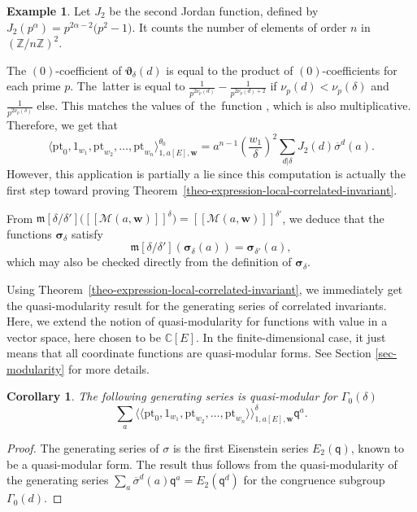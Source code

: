 \documentclass[11pt]{article}
\numberwithin{equation}{section}
\newcommand{\fvir}[2]{[\![ #1 ]\!]^{#2}}
\newcommand{\pt}{\mathrm{pt}}
\newcommand{\m}[1]{\mfk\left[ #1 \right]}
\newcommand{\ZZ}{\mathbb{Z}}
\newcommand{\CC}{\mathbb{C}}
\newcommand{\bfw}{ {\boldsymbol w} }
\newcommand{\mfk}{\mathfrak{m}}
\newcommand{\sfq}{\mathsf{q}}
\newcommand{\M}{\mathcal{M}}
\numberwithin{equation}{section}
\newtheorem{coro}[theo]{Corollary}
\theoremstyle{definition}
\newtheorem{expl}[theo]{Example}
\begin{document}
\begin{expl}
 Let $J_2$ be the second Jordan function, defined by $J_2(p^\alpha)=p^{2\alpha-2}\bigl(p^2-1\bigr)$. It counts the number of elements of order $n$ in $(\ZZ/n\ZZ)^2$.

 The $(0)$-coefficient of $\boldsymbol{\vartheta}_\delta(d)$ is equal to the product of $(0)$-coefficients for each prime $p$. The~latter is equal to $\frac{1}{p^{2\nu_p(d)}}\!-\!\frac{1}{p^{2\nu_p(d)+2}}$ if $\nu_p(d)\!<\!\nu_p(\delta)$ and $\frac{1}{p^{2\nu_p(\delta)}}$ else. This matches the values of~the~function , which is also multiplicative. Therefore,
 we get that
 \[ \langle \pt_0,1_{w_1},\pt_{w_2},\dots,\pt_{w_n}\rangle^{\theta_0}_{1,a[E],\bfw} =a^{n-1}\left(\frac{w_1}{\delta}\right)^2\sum_{d|\delta}J_2(d)\overline{\sigma}^d(a). \]
 However, this application is partially a lie since this computation is actually the first step toward proving Theorem~\ref{theo-expression-local-correlated-invariant}.
\end{expl}

From $\m{\delta/\delta'}\bigl(\fvir{\M(a,\bfw)}{\delta}\bigr) = \fvir{\M(a,\bfw)}{\delta'}$, we deduce that the functions $\boldsymbol{\sigma}_\delta$ satisfy
\[ \m{\delta/\delta'}(\boldsymbol{\sigma}_\delta(a)) = \boldsymbol{\sigma}_{\delta'}(a),\]
which may also be checked directly from the definition of $\boldsymbol{\sigma}_\delta$.

Using Theorem~\ref{theo-expression-local-correlated-invariant}, we immediately get the quasi-modularity result for the generating series of correlated invariants. Here, we extend the notion of quasi-modularity for functions with value in a vector space, here chosen to be $\CC[E]$. In the finite-dimensional case, it just means that all coordinate functions are quasi-modular forms. See Section \ref{sec-modularity} for more details.

\begin{coro}
The following generating series is quasi-modular for $\Gamma_0(\delta)$
\[ \sum_a \langle\langle \pt_0,1_{w_1},\pt_{w_2},\dots,\pt_{w_n} \rangle\rangle^\delta_{1,a[E],\bfw}\sfq^a.\]
\end{coro}

\begin{proof}
 The generating series of $\sigma$ is the first Eisenstein series $E_2(\sfq)$, known to be a quasi-modular form. The result thus follows from the quasi-modularity of the generating series $\sum_a \overline{\sigma}^d(a)\sfq^a = E_2(\sfq^d)$ for the congruence subgroup $\Gamma_0(d)$.
\end{proof}
\end{document}

